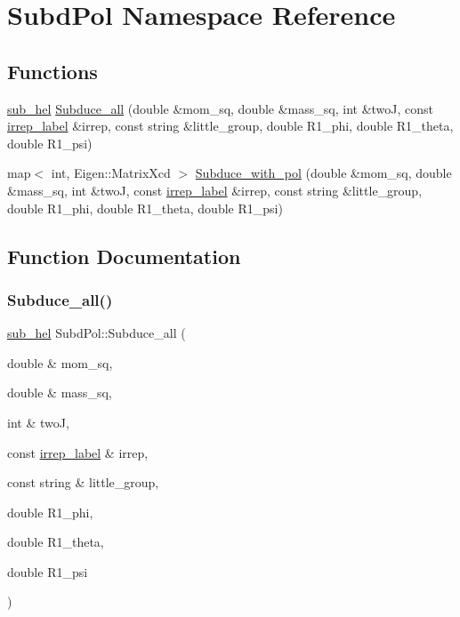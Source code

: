 \hypertarget{namespaceSubdPol}{}\section{Subd\+Pol Namespace Reference}
\label{namespaceSubdPol}
\subsection*{Functions}
\begin{DoxyCompactItemize}
\item 
\mbox{\hyperlink{structsub__hel}{sub\+\_\+hel}} \mbox{\hyperlink{namespaceSubdPol_a5ddb170891621f66c6e8b9a0e51dd362}{Subduce\+\_\+all}} (double \&mom\+\_\+sq, double \&mass\+\_\+sq, int \&twoJ, const \mbox{\hyperlink{structirrep__label}{irrep\+\_\+label}} \&irrep, const string \&little\+\_\+group, double R1\+\_\+phi, double R1\+\_\+theta, double R1\+\_\+psi)
\item 
map$<$ int, Eigen\+::\+Matrix\+Xcd $>$ \mbox{\hyperlink{namespaceSubdPol_ad6ba4f4261604a40b788b2922ed2871e}{Subduce\+\_\+with\+\_\+pol}} (double \&mom\+\_\+sq, double \&mass\+\_\+sq, int \&twoJ, const \mbox{\hyperlink{structirrep__label}{irrep\+\_\+label}} \&irrep, const string \&little\+\_\+group, double R1\+\_\+phi, double R1\+\_\+theta, double R1\+\_\+psi)
\end{DoxyCompactItemize}


\subsection{Function Documentation}
\mbox{\label{namespaceSubdPol_a5ddb170891621f66c6e8b9a0e51dd362}} 
\subsubsection{\texorpdfstring{Subduce\_all()}{Subduce\_all()}}
{\footnotesize\ttfamily \mbox{\hyperlink{structsub__hel}{sub\+\_\+hel}} Subd\+Pol\+::\+Subduce\+\_\+all (\begin{DoxyParamCaption}\item[{double \&}]{mom\+\_\+sq,  }\item[{double \&}]{mass\+\_\+sq,  }\item[{int \&}]{twoJ,  }\item[{const \mbox{\hyperlink{structirrep__label}{irrep\+\_\+label}} \&}]{irrep,  }\item[{const string \&}]{little\+\_\+group,  }\item[{double}]{R1\+\_\+phi,  }\item[{double}]{R1\+\_\+theta,  }\item[{double}]{R1\+\_\+psi }\end{DoxyParamCaption})}

